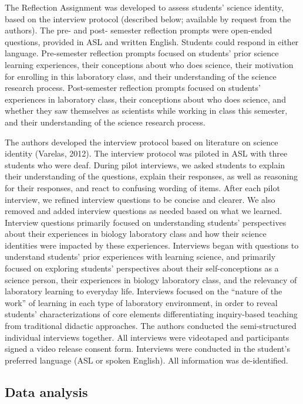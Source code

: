\documentclass[11.5pt]{sig-alternate} %
\begin{document}
\begin{large}
The Reflection Assignment was developed to assess students’ science identity, based on the interview protocol (described below; available by request from the authors). The pre- and post- semester reflection prompts were open-ended questions, provided in ASL and written English. Students could respond in either language. Pre-semester reflection prompts focused on students’ prior science learning experiences, their conceptions about who does science, their motivation for enrolling in this laboratory class, and their understanding of the science research process. Post-semester reflection prompts focused on students’ experiences in laboratory class, their conceptions about who does science, and whether they saw themselves as scientists while working in class this semester, and their understanding of the science research process.

The authors developed the interview protocol based on literature on science identity (Varelas, 2012). The interview protocol was piloted in ASL with three students who were deaf. During pilot interviews, we asked students to explain their understanding of the questions, explain their responses, as well as reasoning for their responses, and react to confusing wording of items. After each pilot interview, we refined interview questions to be concise and clearer. We also removed and added interview questions as needed based on what we learned. Interview questions primarily focused on understanding students’ perspectives about their experiences in biology laboratory class and how their science identities were impacted by these experiences. Interviews began with questions to understand students’ prior experiences with learning science, and primarily focused on exploring students’ perspectives about their self-conceptions as a science person, their experiences in biology laboratory class, and the relevancy of laboratory learning to everyday life. Interviews focused on the “nature of the work” of learning in each type of laboratory environment, in order to reveal students’ characterizations of core elements differentiating inquiry-based teaching from traditional didactic approaches. The authors conducted the semi-structured individual interviews together. All interviews were videotaped and participants signed a video release consent form. Interviews were conducted in the student’s preferred language (ASL or spoken English). All information was de-identified. 

\subsection*{Data analysis}


\end{large}
\end{document}
